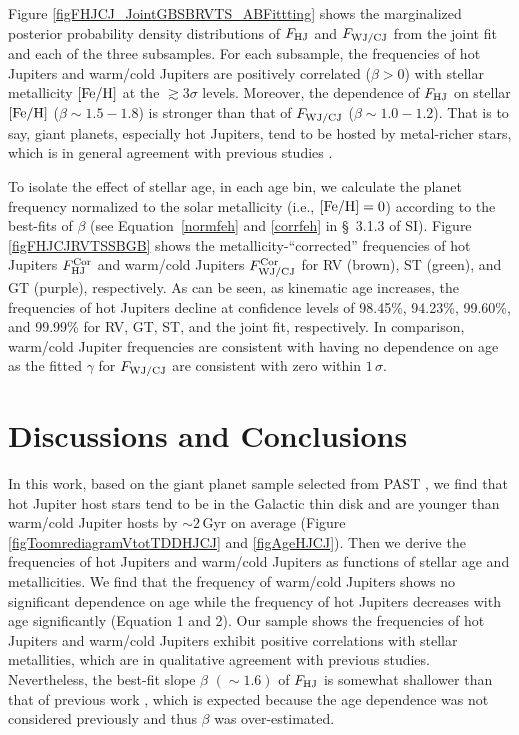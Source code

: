 \documentclass[twocolumn]{pnas-new}
\begin{document}
Figure \ref{figFHJCJ_JointGBSBRVTS_ABFittting} shows the marginalized posterior probability density distributions of $F_{\rm HJ}$ and $F_{\rm WJ/CJ}$ from the joint fit and each of the three subsamples. 
For each subsample, the frequencies of hot Jupiters and warm/cold Jupiters are positively correlated ($\beta>0$) with stellar metallicity $\rm [Fe/H]$ at the $\gtrsim 3 \sigma$ levels. Moreover, the dependence of $F_{\rm HJ}$ on stellar $\rm [Fe/H]$ ($\beta \sim 1.5-1.8$) is stronger than that of $F_{\rm WJ/CJ}$ ($\beta \sim 1.0-1.2$). 
That is to say, giant planets, especially hot Jupiters, tend to be hosted by metal-richer stars, which is in general agreement with previous studies \citep{2010PASP..122..905J,2017ApJ...838...25G}.

To isolate the effect of stellar age, in each age bin, we calculate the planet frequency normalized to the solar metallicity (i.e., $\rm [Fe/H]=0$) according to the best-fits of $\beta$ (see Equation~\ref{normfeh} and \ref{corrfeh} in \S~3.1.3 of SI). 
Figure \ref{figFHJCJRVTSSBGB} shows the metallicity-``corrected'' frequencies of hot Jupiters $F^{\rm Cor}_{\rm HJ}$ and warm/cold Jupiters $F^{\rm Cor}_{\rm WJ/CJ}$ for RV (brown), ST (green), 
and GT (purple), respectively. 
As can be seen, as kinematic age increases, the frequencies of hot Jupiters decline at confidence levels of 98.45\%, 94.23\%, 99.60\%, and 99.99\% for RV, GT, ST, and the joint fit, respectively.
In comparison, warm/cold Jupiter frequencies are consistent with having no dependence on age as the fitted $\gamma$ for $F_{\rm WJ/CJ}$ are consistent with zero within $1\,\sigma$.




\section*{Discussions and Conclusions}
In this work, based on the giant planet sample selected from PAST \uppercase\expandafter{},
we find that hot Jupiter host stars tend to be in the Galactic thin disk and are younger than warm/cold Jupiter hosts by $\sim 2$\,Gyr on average (Figure \ref{figToomrediagramVtotTDDHJCJ} and \ref{figAgeHJCJ}).
Then we derive the frequencies of hot Jupiters and warm/cold Jupiters as functions of stellar age and metallicities.
We find that the frequency of warm/cold Jupiters shows no significant dependence on age while the frequency of hot Jupiters decreases with age significantly (Equation 1 and 2).
Our sample shows the frequencies of hot Jupiters and warm/cold Jupiters exhibit positive correlations with stellar metallities, which are in qualitative agreement with previous studies. 
Nevertheless, the best-fit slope $\beta$ $(\sim1.6)$ of $F_{\rm HJ}$ is somewhat shallower than that of previous work \citep[$\sim2.1$;][]{2017ApJ...838...25G}, which is expected because the age dependence was not considered previously and thus $\beta$ was over-estimated.
\end{document}
